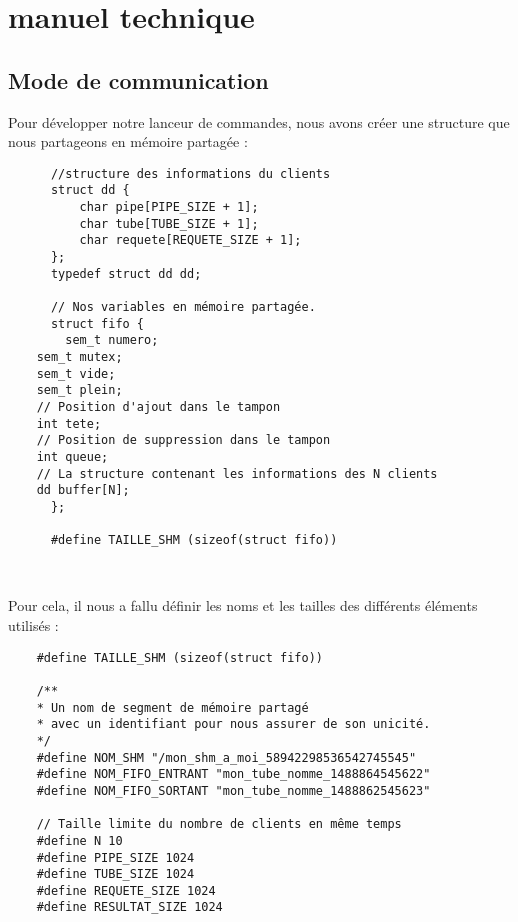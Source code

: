 
\newsavebox{\BBbox}
\newenvironment{DDbox}[1]{
\begin{lrbox}{\BBbox}\begin{minipage}{\linewidth}}
{\end{minipage}\end{lrbox}\noindent\colorbox{Zgris}{\usebox{\BBbox}} \\
[.5cm]}

\section{manuel technique}

\subsection{Mode de communication}

Pour développer notre lanceur de commandes, 
nous avons créer une structure que 
nous partageons en mémoire partagée :


\begin{DDbox}{\linewidth}
  \begin{Verbatim}
      //structure des informations du clients
      struct dd {
	      char pipe[PIPE_SIZE + 1];
	      char tube[TUBE_SIZE + 1];
	      char requete[REQUETE_SIZE + 1];
      };
      typedef struct dd dd;

      // Nos variables en mémoire partagée.
      struct fifo {
        sem_t numero;
	sem_t mutex;
	sem_t vide;
	sem_t plein;
	// Position d'ajout dans le tampon
	int tete;      
	// Position de suppression dans le tampon
	int queue;    
	// La structure contenant les informations des N clients
	dd buffer[N]; 
      };

      #define TAILLE_SHM (sizeof(struct fifo))
  \end{Verbatim}
\end{DDbox}

\newpage

Pour cela, il nous a fallu définir les noms 
et les tailles des différents éléments utilisés :

\begin{DDbox}{\linewidth}
  \begin{Verbatim}
    #define TAILLE_SHM (sizeof(struct fifo))

    /**
    * Un nom de segment de mémoire partagé 
    * avec un identifiant pour nous assurer de son unicité.
    */
    #define NOM_SHM "/mon_shm_a_moi_58942298536542745545"
    #define NOM_FIFO_ENTRANT "mon_tube_nomme_1488864545622"
    #define NOM_FIFO_SORTANT "mon_tube_nomme_1488862545623"

    // Taille limite du nombre de clients en même temps
    #define N 10
    #define PIPE_SIZE 1024
    #define TUBE_SIZE 1024
    #define REQUETE_SIZE 1024
    #define RESULTAT_SIZE 1024
  \end{Verbatim}
\end{DDbox}


